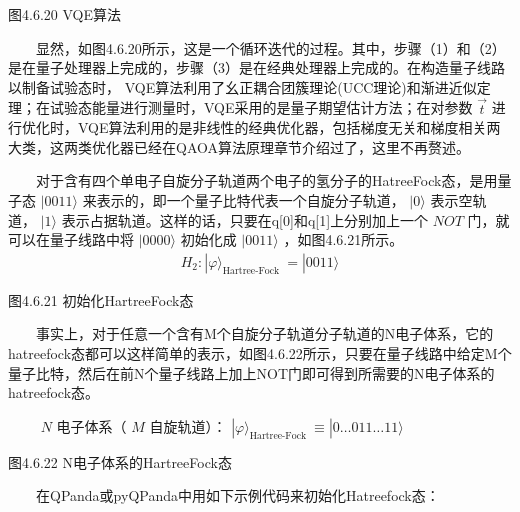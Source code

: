 \documentclass[a4paper,11pt,english]{sphinxmanual}
\begin{document}
\begin{center}图4.6.20 VQE算法
\end{center}
\sphinxAtStartPar
  显然，如图4.6.20所示，这是一个循环迭代的过程。其中，步骤（1）和（2）是在量子处理器上完成的，步骤（3）是在经典处理器上完成的。在构造量子线路以制备试验态时， VQE算法利用了幺正耦合团簇理论(UCC理论)和渐进近似定理；在试验态能量进行测量时，VQE采用的是量子期望估计方法；在对参数  \(\vec{t}\) 进行优化时，VQE算法利用的是非线性的经典优化器，包括梯度无关和梯度相关两大类，这两类优化器已经在QAOA算法原理章节介绍过了，这里不再赘述。

\sphinxAtStartPar
{}

\sphinxAtStartPar
  对于含有四个单电子自旋分子轨道两个电子的氢分子的Hatree\sphinxhyphen{}Fock态，是用量子态 \(|0011\rangle\) 来表示的，即一个量子比特代表一个自旋分子轨道， \(|0\rangle\) 表示空轨道， \(|1\rangle\) 表示占据轨道。这样的话，只要在q{[}0{]}和q{[}1{]}上分别加上一个 \(NOT\) 门，就可以在量子线路中将 \(|0000\rangle\) 初始化成 \(|0011\rangle\) ，如图4.6.21所示。
\begin{equation*}
\begin{split}H_{2}:|\varphi\rangle_{\text {Hartree-Fock }}=|0011\rangle\end{split}
\end{equation*}

\begin{center}图4.6.21 初始化Hartree\sphinxhyphen{}Fock态
\end{center}
\sphinxAtStartPar
  事实上，对于任意一个含有M个自旋分子轨道分子轨道的N电子体系，它的hatree\sphinxhyphen{}fock态都可以这样简单的表示，如图4.6.22所示，只要在量子线路中给定M个量子比特，然后在前N个量子线路上加上NOT门即可得到所需要的N电子体系的hatree\sphinxhyphen{}fock态。

\sphinxAtStartPar
   \(N\) 电子体系（ \(M\) 自旋轨道）： \(|\varphi\rangle_{\text {Hartree-Fock }} \equiv |0 \ldots 011 \ldots 11\rangle\)


\begin{center}图4.6.22 N电子体系的Hartree\sphinxhyphen{}Fock态
\end{center}
\sphinxAtStartPar
  在QPanda或pyQPanda中用如下示例代码来初始化Hatree\sphinxhyphen{}fock态：
\end{document}

